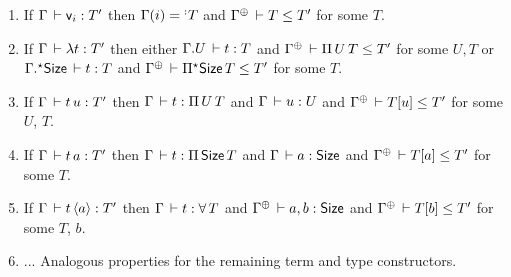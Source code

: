 \documentclass[acmsmall,screen]{acmart}\settopmatter{}
\newcommand{\LONGVERSION}[1]{}
\newcommand{\SHORTVERSION}[1]{#1}
\begin{document}
\begin{lemma}
\label{lem:invty} \bla
\begin{enumerate}
\LONGVERSION{
\item If\/ $\Gamma \der \Nat a : T'$ then $\Gamma \der a : \Size$ and $\resurrect\Gamma \der \Set[0] \leq T'$.
\item If\/ $\Gamma \der \Set[\ell] : T'$ then $\resurrect\Gamma \der \Set[\ell+1] \leq T'$.
\item If\/ $\Gamma \der \piT U T : T'$ then $\Gamma \der U : s$ and $\cext \Gamma U \der T : s$ and $\resurrect\Gamma \der s \leq T'$ for some $s$.
\item If\/ $\Gamma \der \epiT \Size T : T'$ then
  $\cext\Gamma \Size \der T : s$ and $\resurrect\Gamma \der s \leq T'$.
}
\item If\/ $\Gamma \der \ind i : T'$ then $\Gamma(i) = \erann[\noterased] T$ and $\resurrect\Gamma \der T \leq T'$ for some $T$.
\item If\/ $\Gamma \der \lambda t : T'$ then either
  $\cext \Gamma U \der t : T$
  and
  $\resurrect\Gamma \der \piT U T \leq T'$
  for some $U,T$ or
  $\eext \Gamma \Size \der t : T$
  and
  $\resurrect\Gamma \der \epiT\Size T \leq T'$
  for some $T$.
\item If\/ $\Gamma \der t\,u : T'$ then $\Gamma \der t : \piT U T$ and $\Gamma \der u : U$ and $\resurrect\Gamma \der T[u] \leq T'$ for some $U$, $T$.
\item If\/ $\Gamma \der t\,a : T'$ then $\Gamma \der t : \piT \Size T$ and $\Gamma \der a : \Size$ and $\resurrect\Gamma \der T[a] \leq T'$ for some $T$.
\item If\/ $\Gamma \der t\,\ann a : T'$ then
   $\Gamma \der t : \forallT T$ and
   $\resurrect\Gamma \der a,b : \Size$ and
   $\resurrect\Gamma \der T[b] \leq T'$ for some $T$, $b$.
\LONGVERSION{
\item If\/ $\Gamma \der \zero a : T'$ then $\resurrect \Gamma \der a,b : \Size$ and $\resurrect\Gamma \der \Nat (b + 1) \leq T'$ for some $b$.
\item If\/ $\Gamma \der \suc a t : T'$ then $\resurrect \Gamma \der a,b : \Size$ and $\Gamma \der t : \Nat b$ and $\resurrect\Gamma \der \Nat(b+1) \leq T'$.
\item If\/ $\Gamma \der u\,\case[\ell] T {t_z} {t_s} : T'$ then $\Gamma \der u : \Nat (a+1)$ and $\Gamma \der T : \Nat(a+1) \to \Set[\ell]$ and $\Gamma \der t_z : T\,(\zero a)$ and $\Gamma \der t_s : \funT x {\Nat a} {T\,(\suc a x)}$ and $\resurrect\Gamma \der T\,u \leq T'$ for some $a$.
\item If\/ $\Gamma \der u\,\fix[\ell] T t : T'$ then
  $\Gamma \der u : \Nat a$ and
  $\Gamma \der T : \Adm\,\ell$ and
  $\Gamma \der t : \FixT\,T$ and
  $\resurrect\Gamma \der T\,a\,u \leq T'$.
} %
\SHORTVERSION{
\item ... Analogous properties for the remaining term and type constructors.
}
\end{enumerate}
\end{lemma}
\end{document}
